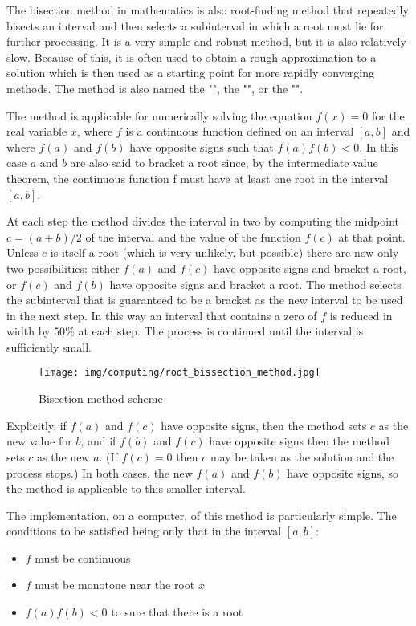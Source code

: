 	The bisection method in mathematics is also root-finding method that repeatedly bisects an interval and then selects a subinterval in which a root must lie for further processing. It is a very simple and robust method, but it is also relatively slow. Because of this, it is often used to obtain a rough approximation to a solution which is then used as a starting point for more rapidly converging methods. The method is also named the "", the "", or the "".
	
	The method is applicable for numerically solving the equation $f(x) = 0$ for the real variable $x$, where $f$ is a continuous function defined on an interval $[a, b]$ and where $f(a)$ and $f(b)$ have opposite signs such that $f(a)f(b)<0$. In this case $a$ and $b$ are also said to bracket a root since, by the intermediate value theorem, the continuous function f must have at least one root in the interval $[a, b]$.

	At each step the method divides the interval in two by computing the midpoint $c = (a+b) / 2$ of the interval and the value of the function $f(c)$ at that point. Unless $c$ is itself a root (which is very unlikely, but possible) there are now only two possibilities: either $f(a)$ and $f(c)$ have opposite signs and bracket a root, or $f(c)$ and $f(b)$ have opposite signs and bracket a root. The method selects the subinterval that is guaranteed to be a bracket as the new interval to be used in the next step. In this way an interval that contains a zero of $f$ is reduced in width by $50\%$ at each step. The process is continued until the interval is sufficiently small.

	\begin{figure}[H]
		\centering
		\texttt{[image: img/computing/root\_bissection\_method.jpg]}
		\caption{Bisection method scheme}
	\end{figure}

	Explicitly, if $f(a)$ and $f(c)$ have opposite signs, then the method sets $c$ as the new value for $b$, and if $f(b)$ and $f(c)$ have opposite signs then the method sets $c$ as the new $a$. (If $f(c)=0$ then $c$ may be taken as the solution and the process stops.) In both cases, the new $f(a)$ and $f(b)$ have opposite signs, so the method is applicable to this smaller interval.
	
	The implementation, on a computer, of this method is particularly simple. The conditions to be satisfied being only that in the interval $[a,b]$:
	\begin{itemize}
		\item $f$ must be continuous

		\item $f$ must be monotone near the root $\bar{x}$
		
		\item $f(a)f(b)<0$ to sure that there is a root
	\end{itemize}
	

